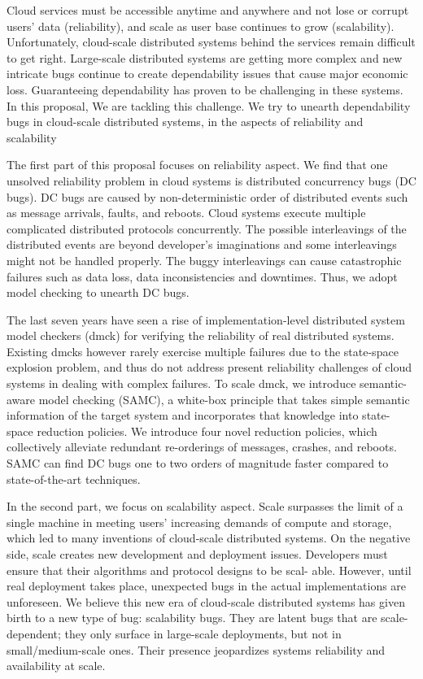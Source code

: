 Cloud services must be accessible anytime and anywhere and not lose or corrupt
users' data (reliability), and scale as user base continues to grow
(scalability). Unfortunately, cloud-scale distributed systems behind the
services remain difficult to get right. Large-scale distributed systems are
getting more complex and new intricate bugs continue to create dependability
issues that cause major economic loss. Guaranteeing dependability has proven to
be challenging in these systems. In this proposal, We are tackling this
challenge. We try to unearth dependability bugs in cloud-scale distributed
systems, in the aspects of reliability and scalability

The first part of this proposal focuses on reliability aspect. We find that one
unsolved reliability problem in cloud systems is distributed concurrency bugs
(DC bugs). DC bugs are caused by non-deterministic order of distributed events
such as message arrivals, faults, and reboots. Cloud systems execute multiple
complicated distributed protocols concurrently. The possible interleavings of
the distributed events are beyond developer's imaginations and some
interleavings might not be handled properly. The buggy interleavings can cause
catastrophic failures such as data loss, data inconsistencies and downtimes.
Thus, we adopt model checking to unearth DC bugs.

The last seven years have seen a rise of implementation-level distributed system
model checkers (dmck) for verifying the reliability of real distributed systems.
Existing dmcks however rarely exercise multiple failures due to the state-space
explosion problem, and thus do not address present reliability challenges of
cloud systems in dealing with complex failures. To scale dmck, we introduce
semantic-aware model checking (SAMC), a white-box principle that takes simple
semantic information of the target system and incorporates that knowledge into
state-space reduction policies. We introduce four novel reduction policies,
which collectively alleviate redundant re-orderings of messages, crashes, and
reboots. SAMC can find DC bugs one to two orders of magnitude faster compared to
state-of-the-art techniques. 

In the second part, we focus on scalability aspect. Scale surpasses the limit of
a single machine in meeting users' increasing demands of compute and storage,
which led to many inventions of cloud-scale distributed systems.  On the
negative side, scale creates new development and deployment issues.  Developers
must ensure that their algorithms and protocol designs to be scal- able.
However, until real deployment takes place, unexpected bugs in the actual
implementations are unforeseen. We believe this new era of cloud-scale
distributed systems has given birth to a new type of bug: scalability bugs.
They are latent bugs that are scale-dependent; they only surface in large-scale
deployments, but not in small/medium-scale ones. Their presence jeopardizes
systems reliability and availability at scale.

